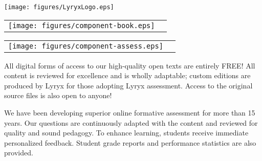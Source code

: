 \setlength{\parskip}{0pt}
\thispagestyle{empty}


\vspace{-3em}
\begin{center}
	\texttt{[image: figures/LyryxLogo.eps]}

	\vspace{2em}
	\textcolor{lscstextcolour}{\textbf{\fontsize{24}{28}\selectfont {Champions of Access to Knowledge}}}
\end{center}

\vfill

\begin{multicols}{2}
\begin{center}
\begin{lscshdrbox}
\begin{tabu}{X[1,c,m] X[2,l,m]}
\vspace{0pt}
\texttt{[image: figures/component-book.eps]}
&
\vspace{0pt}
\textcolor{white}{\textbf{\fontsize{14}{20}\selectfont {OPEN TEXT}}}
\end{tabu}
\end{lscshdrbox}
\end{center}

\columnbreak

\begin{center}
\begin{lscshdrbox}
\begin{tabu}{X[1,c,m] X[2,l,m]}
\vspace{0pt}
\texttt{[image: figures/component-assess.eps]}
&
\vspace{0pt}
\textcolor{white}{\textbf{\fontsize{14}{20}\selectfont {ONLINE ASSESSMENT}}}
\end{tabu}
\end{lscshdrbox}
\end{center}
\end{multicols}

\begin{center}
\begin{multicols}{2}
\parbox{0.9\linewidth}{
All digital forms of access to our high-quality open texts are entirely FREE! All content is reviewed for excellence and is wholly adaptable; custom editions are produced by Lyryx for those adopting Lyryx assessment. Access to the original source files is also open to anyone!
}

\columnbreak

\parbox{0.9\linewidth}{
We have been developing superior online formative assessment for more than 15 years. Our questions are continuously adapted with the content and reviewed for quality and sound pedagogy. To enhance learning, students receive immediate personalized feedback. Student grade reports and performance statistics are also provided.
	}
\end{multicols}
\end{center}

